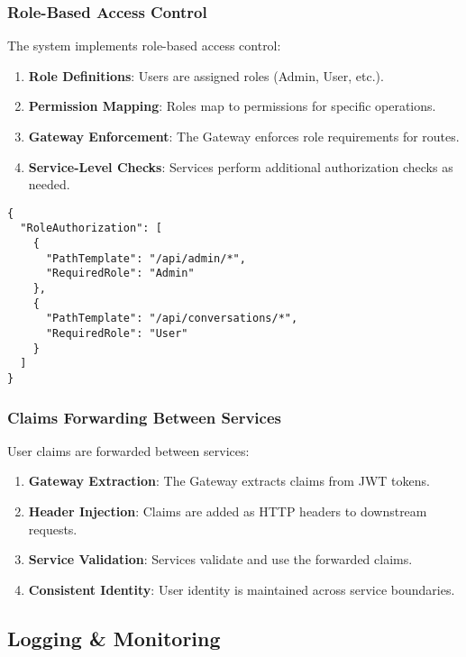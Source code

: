 \subsubsection{Role-Based Access Control}

The system implements role-based access control:

\begin{enumerate}
   \item \textbf{Role Definitions}: Users are assigned roles (Admin, User, etc.).
   \item \textbf{Permission Mapping}: Roles map to permissions for specific operations.
   \item \textbf{Gateway Enforcement}: The Gateway enforces role requirements for routes.
   \item \textbf{Service-Level Checks}: Services perform additional authorization checks as needed.
\end{enumerate}

\begin{verbatim}
{
  "RoleAuthorization": [
    {
      "PathTemplate": "/api/admin/*",
      "RequiredRole": "Admin"
    },
    {
      "PathTemplate": "/api/conversations/*",
      "RequiredRole": "User"
    }
  ]
}
\end{verbatim}

\subsubsection{Claims Forwarding Between Services}

User claims are forwarded between services:

\begin{enumerate}
   \item \textbf{Gateway Extraction}: The Gateway extracts claims from JWT tokens.
   \item \textbf{Header Injection}: Claims are added as HTTP headers to downstream requests.
   \item \textbf{Service Validation}: Services validate and use the forwarded claims.
   \item \textbf{Consistent Identity}: User identity is maintained across service boundaries.
\end{enumerate}

\subsection{Logging \& Monitoring}

